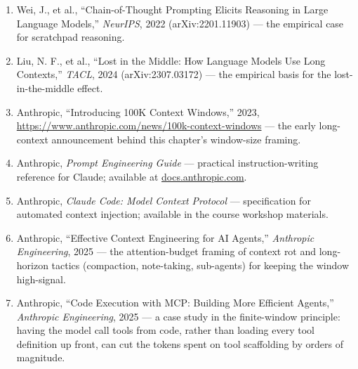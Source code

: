 \begin{small}
\begin{enumerate}
\item Wei, J., et al., ``Chain-of-Thought Prompting Elicits Reasoning in Large Language Models,'' \emph{NeurIPS}, 2022 (arXiv:2201.11903) — the empirical case for scratchpad reasoning.
\item Liu, N. F., et al., ``Lost in the Middle: How Language Models Use Long Contexts,'' \emph{TACL}, 2024 (arXiv:2307.03172) — the empirical basis for the lost-in-the-middle effect.
\item Anthropic, ``Introducing 100K Context Windows,'' 2023, \url{https://www.anthropic.com/news/100k-context-windows} — the early long-context announcement behind this chapter's window-size framing.
\item Anthropic, \emph{Prompt Engineering Guide} — practical instruction-writing reference for Claude; available at \href{https://docs.anthropic.com/prompt-engineering}{docs.anthropic.com}.
\item Anthropic, \emph{Claude Code: Model Context Protocol} — specification for automated context injection; available in the course workshop materials.
\item Anthropic, ``Effective Context Engineering for AI Agents,'' \emph{Anthropic Engineering}, 2025 — the attention-budget framing of context rot and long-horizon tactics (compaction, note-taking, sub-agents) for keeping the window high-signal.
\item Anthropic, ``Code Execution with MCP: Building More Efficient Agents,'' \emph{Anthropic Engineering}, 2025 — a case study in the finite-window principle: having the model call tools from code, rather than loading every tool definition up front, can cut the tokens spent on tool scaffolding by orders of magnitude.
\end{enumerate}
\end{small}
